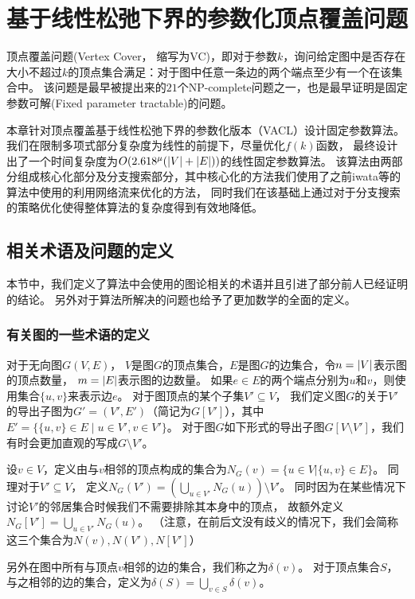 \chapter{基于线性松弛下界的参数化顶点覆盖问题}
顶点覆盖问题(Vertex Cover， 缩写为VC)，即对于参数$k$，询问给定图中是否存在大小不超过$k$的顶点集合满足：对于图中任意一条边的两个端点至少有一个在该集合中。
该问题是最早被提出来的$21$个NP-complete问题之一\cite{karp1972reducibility}，也是最早证明是固定参数可解(Fixed parameter tractable)的问题\cite{downey2012parameterized}。

本章针对顶点覆盖基于线性松弛下界的参数化版本（VACL）设计固定参数算法。
我们在限制多项式部分复杂度为线性的前提下，尽量优化$f(k)$函数，
最终设计出了一个时间复杂度为$O(2.618^{\mu}(\left\vert V \right\vert + \left\vert E \right\vert))$的线性固定参数算法。
该算法由两部分组成核心化部分及分支搜索部分，其中核心化的方法我们使用了之前iwata等的算法中使用的利用网络流来优化的方法，
同时我们在该基础上通过对于分支搜索的策略优化使得整体算法的复杂度得到有效地降低。

\section{相关术语及问题的定义}
本节中，我们定义了算法中会使用的图论相关的术语并且引进了部分前人已经证明的结论。
另外对于算法所解决的问题也给予了更加数学的全面的定义。

\subsection{有关图的一些术语的定义}
对于无向图$G(V,E)$， $V$是图$G$的顶点集合，$E$是图$G$的边集合，令$n = \left\vert V \right\vert$表示图的顶点数量， $m = \left\vert E \right\vert$表示图的边数量。
如果$e \in E$的两个端点分别为$u$和$v$，则使用集合$\{u, v \}$来表示边$e$。
对于图顶点的某个子集$V' \subseteq V$， 我们定义图$G$的关于$V'$的导出子图为$G' = (V', E')$（简记为$G[V']$），其中$E' = \{\{u, v\} \in E\;|\;u \in V', v \in V' \}$。
对于图$G$如下形式的导出子图$G[V \setminus V']$，我们有时会更加直观的写成$G \setminus V'$。

设$v \in V$，定义由与$v$相邻的顶点构成的集合为$N_{G}(v) = \{ u \in V | \{u, v\} \in E\}$。
同理对于$V' \subseteq V$， 定义$N_{G}(V') = (\bigcup_{u \in V'}N_{G}(u)) \setminus V' $。
同时因为在某些情况下讨论$V'$的邻居集合时候我们不需要排除其本身中的顶点，
故额外定义$N_{G}[V'] = \bigcup_{u \in V'}N_{G}(u)$。
（注意，在前后文没有歧义的情况下，我们会简称这三个集合为$N(v), N(V'),N[V']$）

另外在图中所有与顶点$v$相邻的边的集合，我们称之为$\delta(v)$。
对于顶点集合$S$，与之相邻的边的集合，定义为$\delta(S) = \bigcup_{v \in S}\delta(v)$。

